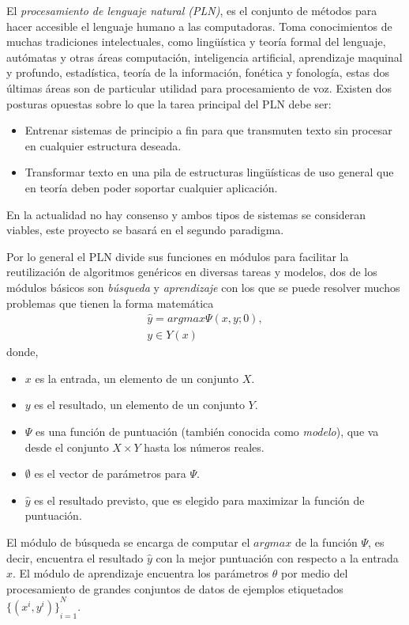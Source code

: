 El \emph{procesamiento de lenguaje natural (PLN)}, es el conjunto de métodos para hacer accesible el lenguaje humano a las computadoras\cite{eise19}. Toma conocimientos de muchas tradiciones intelectuales, como lingüística y teoría formal del lenguaje, autómatas y otras áreas computación, inteligencia artificial, aprendizaje maquinal y profundo, estadística, teoría de la información, fonética y fonología, estas dos últimas áreas son de particular utilidad para procesamiento de voz. Existen dos posturas opuestas sobre lo que la tarea principal del PLN debe ser:
\begin{itemize}
	\item Entrenar sistemas de principio a fin para que transmuten texto sin procesar en cualquier estructura deseada.
	\item Transformar texto en una pila de estructuras lingüísticas de uso general que en teoría deben poder soportar cualquier aplicación.
\end{itemize}
En la actualidad no hay consenso y ambos tipos de sistemas se consideran viables, este proyecto se basará en el segundo paradigma. 

Por lo general el PLN divide sus funciones en módulos para facilitar la reutilización de algoritmos genéricos en diversas tareas y modelos, dos de los módulos básicos son \emph{búsqueda} y \emph{aprendizaje} con los que se puede resolver muchos problemas que tienen la forma matemática
\begin{equation}
\begin{matrix}
\hat{y}=argmax\Psi(x,y;0),\\
y\in Y(x)
\end{matrix}\label{EQ:NLP1}
\end{equation}
donde,
\begin{itemize}
	\item $x$ es la entrada, un elemento de un conjunto $X$.
	\item $y$ es el resultado, un elemento de un conjunto $Y$.
	\item $\Psi$ es una función de puntuación (también conocida como \emph{modelo}), que va desde el conjunto $X\times Y$ hasta los números reales.
	\item $\emptyset$ es el vector de parámetros para $\Psi$.
	\item $\hat{y}$ es el resultado previsto, que es elegido para maximizar la función de puntuación.
\end{itemize}
El módulo de búsqueda se encarga de computar el $argmax$ de la función $\Psi$, es decir, encuentra el resultado $\hat{y}$ con la mejor puntuación con respecto a la entrada $x$. El módulo de aprendizaje encuentra los parámetros $\theta$ por medio del procesamiento de grandes conjuntos de datos de ejemplos etiquetados ${\{(x^i,y^i)\}}_{i=1}^{N}$.

